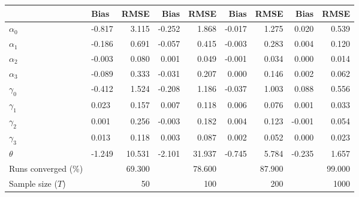 
\begin{tabular}[t]{llrrrrrrr}
\toprule
  & Bias & RMSE & Bias & RMSE & Bias & RMSE & Bias & RMSE\\
\midrule
$\alpha_{0}$ & -0.817 & 3.115 & -0.252 & 1.868 & -0.017 & 1.275 & 0.020 & 0.539\\
$\alpha_{1}$ & -0.186 & 0.691 & -0.057 & 0.415 & -0.003 & 0.283 & 0.004 & 0.120\\
$\alpha_{2}$ & -0.003 & 0.080 & 0.001 & 0.049 & -0.001 & 0.034 & 0.000 & 0.014\\
$\alpha_{3}$ & -0.089 & 0.333 & -0.031 & 0.207 & 0.000 & 0.146 & 0.002 & 0.062\\
$\gamma_{0}$ & -0.412 & 1.524 & -0.208 & 1.186 & -0.037 & 1.003 & 0.088 & 0.556\\
$\gamma_{1}$ & 0.023 & 0.157 & 0.007 & 0.118 & 0.006 & 0.076 & 0.001 & 0.033\\
$\gamma_{2}$ & 0.001 & 0.256 & -0.003 & 0.182 & 0.004 & 0.123 & -0.001 & 0.054\\
$\gamma_{3}$ & 0.013 & 0.118 & 0.003 & 0.087 & 0.002 & 0.052 & 0.000 & 0.023\\
$\theta$ & -1.249 & 10.531 & -2.101 & 31.937 & -0.745 & 5.784 & -0.235 & 1.657\\
Runs converged (\%) &  & 69.300 &  & 78.600 &  & 87.900 &  & 99.000\\
Sample size ($T$) &  & 50 &  & 100 &  & 200 &  & 1000\\
\bottomrule
\end{tabular}
